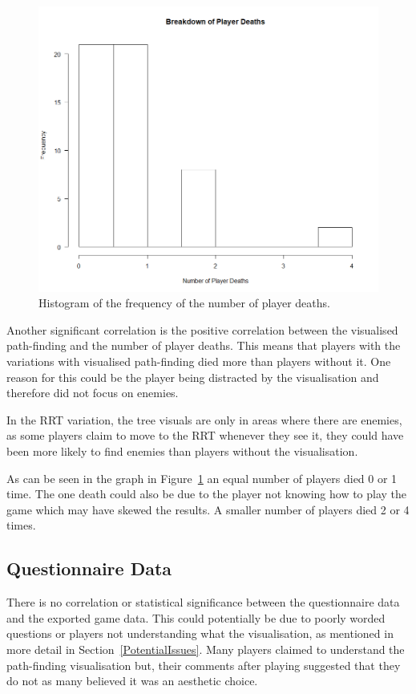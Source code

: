 \documentclass[journal]{IEEEtran}
\begin{document}
	\begin{figure}[h]
		\includegraphics[width=1.0\linewidth]{DeathsHisto.png}
		\caption{Histogram of the frequency of the number of player deaths.}
		\label{graph:DeathsHisto}
	\end{figure}
	Another significant correlation is the positive correlation between the visualised path-finding and the number of player deaths. This means that players with the variations with visualised path-finding died more than players without it. One reason for this could be the player being distracted by the visualisation and therefore did not focus on enemies. 
	
	In the RRT variation, the tree visuals are only in areas where there are enemies, as some players claim to move to the RRT whenever they see it, they could have been more likely to find enemies than players without the visualisation.
	
	As can be seen in the graph in Figure~\ref{graph:DeathsHisto} an equal number of players died 0 or 1 time. The one death could also be due to the player not knowing how to play the game which may have skewed the results. A smaller number of players died 2 or 4 times. 
	
	
	\subsection{Questionnaire Data}
	There is no correlation or statistical significance between the questionnaire data and the exported game data. This could potentially be due to poorly worded questions or players not understanding what the visualisation, as mentioned in more detail in Section~\ref{PotentialIssues}. Many players claimed to understand the path-finding visualisation but, their comments after playing suggested that they do not as many believed it was an aesthetic choice.
	
\end{document}
